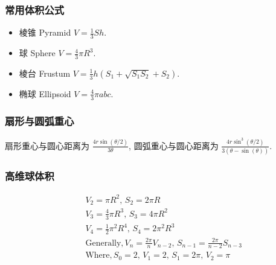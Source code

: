 \begin{small}
\begin{spacing}{0.5}
\subsubsection{常用体积公式}
\begin{itemize}
\item 棱锥 Pyramid $V=\frac{1}{3}Sh$.
\item 球 Sphere $V=\frac{4}{3}\pi R^3$.
\item 棱台 Frustum $V=\frac{1}{3}h(S_1+\sqrt {S_1S_2}+S_2)$.
\item 椭球 Ellipsoid $V=\frac{4}{3} \pi abc$.
\end{itemize}
\subsubsection{扇形与圆弧重心}
扇形重心与圆心距离为 $\frac{4r\sin(\theta/2)}{3\theta}$,
圆弧重心与圆心距离为 $\frac{4r\sin^3(\theta/2)}{3(\theta-\sin(\theta))}$.
\subsubsection{高维球体积}
\begin{eqnarray*}
&& V_2=\pi R^2,\, S_2=2\pi R \\
&& V_3=\frac{4}{3}\pi R^3,\, S_3=4\pi R^2 \\
&& V_4=\frac{1}{2}\pi ^2 R^4,\, S_4=2\pi ^2 R^3 \\
&& \mathrm{Generally}, V_n=\frac{2\pi}{n}V_{n-2},\, S_{n-1}=\frac{2\pi}{n-2}S_{n-3} \\
&& \mathrm{Where}, S_0=2,\, V_1=2,\, S_1=2\pi ,\, V_2=\pi
\end{eqnarray*}
\end{spacing}
\end{small}